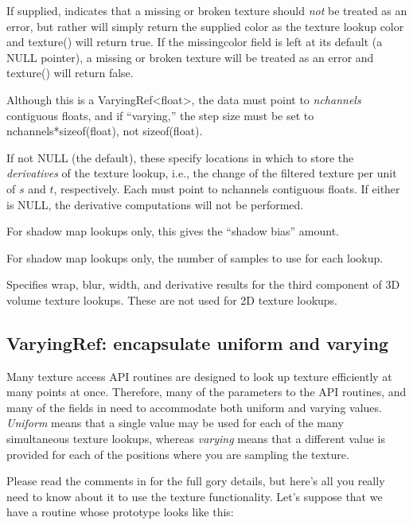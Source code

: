 If supplied, indicates that a missing or broken texture should \emph{not}
be treated as an error, but rather will simply return the supplied color
as the texture lookup color and {\cf texture()} will return {\cf true}.  
If the {\cf missingcolor} field is left at its default (a NULL pointer),
a missing or broken texture will be treated as an error and
{\cf texture()} will return {\cf false}.

Although this is a {\cf VaryingRef<float>}, the data must point to
\emph{nchannels} contiguous floats, and if ``varying,'' the step size must
be set to {\cf nchannels*sizeof(float)}, not {\cf sizeof(float)}.
\apiend

If not NULL (the default), these specify locations in which to store
the \emph{derivatives} of the texture lookup, i.e., the change of the
filtered texture per unit of $s$ and $t$, respectively.  Each must point
to {\cf nchannels} contiguous floats.  If either is NULL, the derivative
computations will not be performed.
\apiend

For shadow map lookups only, this gives the ``shadow bias'' amount.
\apiend

For shadow map lookups only, the number of samples to use for each lookup.
\apiend

Specifies wrap, blur, width, and derivative results for the third
component of 3D volume texture lookups.  These are not used for 2D
texture lookups.
\apiend

\subsection{{\cf VaryingRef}: encapsulate uniform and varying}

Many texture access API routines are designed to look up
texture efficiently at many points at once.  Therefore, many of
the parameters to the API routines, and many of the fields in
\TextureOptions need to accommodate both uniform and varying values.
\emph{Uniform} means that a single value may be used for each of
the many simultaneous texture lookups, whereas \emph{varying} means
that a different value is provided for each of the positions where
you are sampling the texture.

Please read the comments in  for the full gory 
details, but here's all you really need to know about it to use the
texture functionality.  Let's suppose that we have a routine 
whose prototype looks like this:

